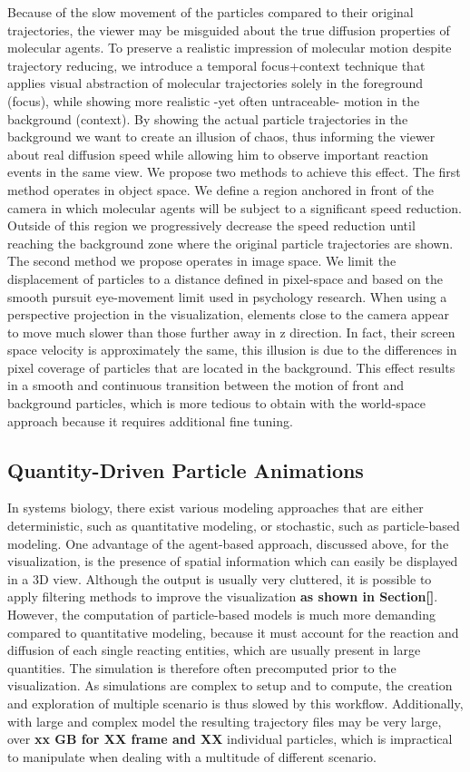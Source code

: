 Because of the slow movement of the particles compared to their original trajectories, the viewer may be misguided about the true diffusion properties of molecular agents.
To preserve a realistic impression of molecular motion despite trajectory reducing, we introduce a temporal focus+context technique that applies visual abstraction of molecular trajectories solely in the foreground (focus), while showing more realistic -yet often untraceable- motion in the background (context).
By showing the actual particle trajectories in the background we want to create an illusion of chaos, thus informing the viewer about real diffusion speed while allowing him to observe important reaction events in the same view.
We propose two methods to achieve this effect.
The first method operates in object space.
We define a region anchored in front of the camera in which molecular agents will be subject to a significant speed reduction.
Outside of this region we progressively decrease the speed reduction until reaching the background zone where the original particle trajectories are shown.
The second method we propose operates in image space.
We limit the displacement of particles to a distance defined in pixel-space and based on the smooth pursuit eye-movement limit used in psychology research.
When using a perspective projection in the visualization, elements close to the camera appear to move much slower than those further away in z direction. 
In fact, their screen space velocity is approximately the same, this illusion is due to the differences in pixel coverage of particles that are located in the background.
This effect results in a smooth and continuous transition between the motion of front and background particles, which is more tedious to obtain with the world-space approach because it requires additional fine tuning.

\subsection{Quantity-Driven Particle Animations}

In systems biology, there exist various modeling approaches that are either deterministic, such as quantitative modeling, or stochastic, such as particle-based modeling.
One advantage of the agent-based approach, discussed above, for the visualization, is the presence of spatial information which can easily be displayed in a 3D view.
Although the output is usually very cluttered, it is possible to apply filtering methods to improve the visualization\textbf{ as shown in Section[]}.
However, the computation of particle-based models is much more demanding compared to quantitative modeling, because it must account for the reaction and diffusion of each single reacting entities, which are usually present in large quantities.
The simulation is therefore often precomputed prior to the visualization.
As simulations are complex to setup and to compute, the creation and exploration of multiple scenario is thus slowed by this workflow.
Additionally, with large and complex model the resulting trajectory files may be very large, over \textbf{xx GB for XX frame and XX} individual particles, which is impractical to manipulate when dealing with a multitude of different scenario.

